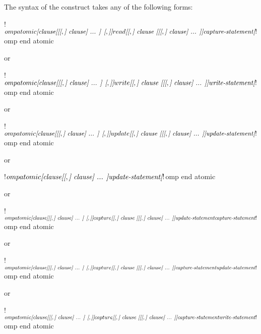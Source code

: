 \begin{fortranspecific}
The syntax of the  construct takes any of the following forms:

\begin{ompfPragma}
!$omp atomic \plc{[clause[[[},\plc{] clause] ... ] [},\plc{]]} read \plc{[[},\plc{] clause [[[},\plc{] clause] ... ]]}
    \plc{capture-statement}
\plc{[}!$omp end atomic\plc{]}
\end{ompfPragma}

or

\begin{ompfPragma}
!$omp atomic \plc{[clause[[[},\plc{] clause] ... ] [},\plc{]]} write \plc{[[},\plc{] clause [[[},\plc{] clause] ... ]]}
    \plc{write-statement}
\plc{[}!$omp end atomic\plc{]}
\end{ompfPragma}

or

\begin{ompfPragma}
!$omp atomic \plc{[clause[[[},\plc{] clause] ... ] [},\plc{]]} update \plc{[[},\plc{] clause [[[},\plc{] clause] ... ]]}
    \plc{update-statement}
\plc{[}!$omp end atomic\plc{]}
\end{ompfPragma}

or

\begin{ompfPragma}
!$omp atomic \plc{[clause[[},\plc{] clause] ... ]}
    \plc{update-statement}
\plc{[}!$omp end atomic\plc{]}
\end{ompfPragma}

or

\begin{ompfPragma}
!$omp atomic \plc{[clause[[[},\plc{] clause] ... ] [},\plc{]]} capture \plc{[[},\plc{] clause [[[},\plc{] clause] ... ]]}
    \plc{update-statement}
    \plc{capture-statement}
!$omp end atomic
\end{ompfPragma}

or

\begin{ompfPragma}
!$omp atomic \plc{[clause[[[},\plc{] clause] ... ] [},\plc{]]} capture \plc{[[},\plc{] clause [[[},\plc{] clause] ... ]]}
    \plc{capture-statement}
    \plc{update-statement}
!$omp end atomic
\end{ompfPragma}

or

\begin{ompfPragma}
!$omp atomic \plc{[clause[[[},\plc{] clause] ... ] [},\plc{]]} capture \plc{[[},\plc{] clause [[[},\plc{] clause] ... ]]}
    \plc{capture-statement}
    \plc{write-statement}
!$omp end atomic
\end{ompfPragma}


\end{fortranspecific}
